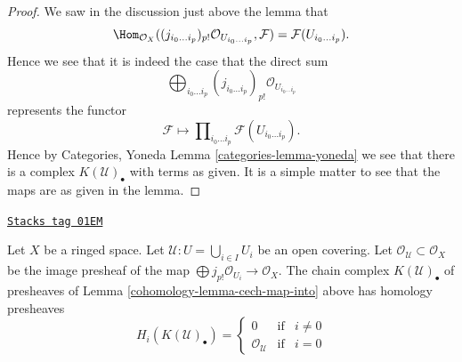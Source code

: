 \begin{proof}
We saw in the discussion just above the lemma that
$$
\Hom_{\mathcal{O}_X}(
(j_{i_0\ldots i_p})_{p!}\mathcal{O}_{U_{i_0\ldots i_p}},
\mathcal{F})
=
\mathcal{F}(U_{i_0\ldots i_p}).
$$
Hence we see that it is indeed the case that the direct sum
$$
\bigoplus\nolimits_{i_0 \ldots i_p}
(j_{i_0 \ldots i_p})_{p!}\mathcal{O}_{U_{i_0 \ldots i_p}}
$$
represents the functor
$$
\mathcal{F}
\longmapsto
\prod\nolimits_{i_0\ldots i_p} \mathcal{F}(U_{i_0\ldots i_p}).
$$
Hence by Categories, Yoneda Lemma \ref{categories-lemma-yoneda}
we see that there is a complex $K(\mathcal{U})_\bullet$ with terms
as given. It is a simple matter to see that the maps are as given
in the lemma.
\end{proof}

\begin{lemma}
\label{cohomology-lemma-homology-complex}
\href{https://stacks.math.columbia.edu/tag/01EM}{\texttt{Stacks tag 01EM}}

Let $X$ be a ringed space.
Let $\mathcal{U} : U = \bigcup_{i \in I} U_i$ be an open covering.
Let $\mathcal{O}_\mathcal{U} \subset \mathcal{O}_X$
be the image presheaf of the map
$\bigoplus j_{p!}\mathcal{O}_{U_i} \to \mathcal{O}_X$.
The chain complex $K(\mathcal{U})_\bullet$ of presheaves
of Lemma \ref{cohomology-lemma-cech-map-into} above has homology presheaves
$$
H_i(K(\mathcal{U})_\bullet) =
\left\{
\begin{matrix}
0 & \text{if} & i \not = 0 \\
\mathcal{O}_\mathcal{U} & \text{if} & i = 0
\end{matrix}
\right.
$$
\end{lemma}

